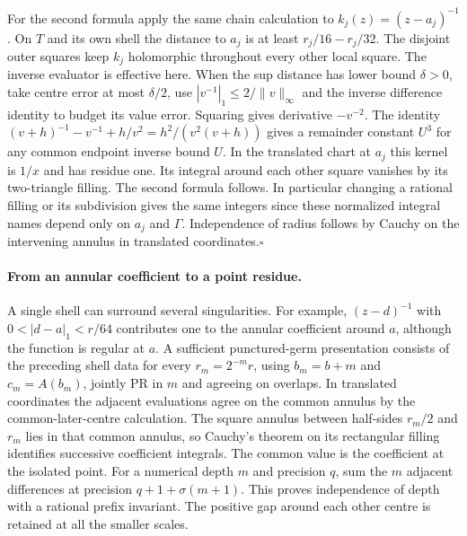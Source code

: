 For the second formula apply the same chain calculation to
$k_j(z)=(z-a_j)^{-1}$. On $T$ and its own shell the distance to $a_j$
is at least $r_j/16-r_j/32$. The disjoint outer squares keep
$k_j$ holomorphic throughout every other local square. The inverse
evaluator is effective here. When the sup distance has lower bound
$\delta>0$, take centre error at most $\delta/2$, use
$|v^{-1}|_1\le2/\lVert v\rVert_\infty$ and the inverse difference
identity to budget its value error. Squaring gives derivative
$-v^{-2}$. The identity
$(v+h)^{-1}-v^{-1}+h/v^2=h^2/(v^2(v+h))$
gives a remainder constant $U^3$ for any common endpoint inverse bound
$U$. In the translated chart at $a_j$ this kernel is $1/x$ and has
residue one. Its integral around each other square vanishes by its
two-triangle filling. The second formula follows. In particular changing
a rational filling or its subdivision gives the same integers since
these normalized integral names depend only on $a_j$ and $\Gamma$.
Independence of radius follows by Cauchy on the intervening annulus
in translated coordinates.\hfill$\square$

\paragraph{From an annular coefficient to a point residue.}
A single shell can surround several singularities. For example,
$(z-d)^{-1}$ with $0<|d-a|_1<r/64$ contributes one to the
annular coefficient around $a$, although the function is regular at $a$.
A sufficient punctured-germ presentation consists of the preceding shell
data for every $r_m=2^{-m}r$, using $b_m=b+m$ and $c_m=A(b_m)$,
jointly PR in $m$ and agreeing on overlaps. In translated coordinates
the adjacent evaluations agree on the common annulus by the
common-later-centre calculation. The square annulus between
half-sides $r_m/2$ and $r_m$ lies in that common annulus, so Cauchy's
theorem on its rectangular filling identifies successive coefficient
integrals. The common value is the coefficient at the isolated point.
For a numerical depth $m$ and precision $q$, sum the $m$ adjacent
differences at precision $q+1+\sigma(m+1)$. This proves independence of
depth with a rational prefix invariant. The positive gap around each
other centre is retained at all the smaller scales.

